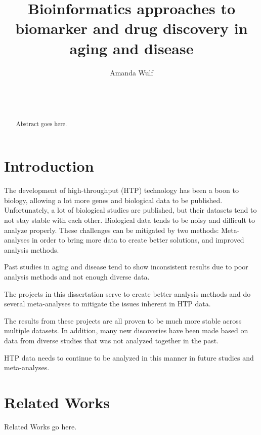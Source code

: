 \documentclass{sig-alternate-05-2015}
\begin{document}
\title{Bioinformatics approaches to biomarker and drug discovery in aging and disease}
\author{
\alignauthor
Amanda Wulf\\
       \\
       \\
       \\
}
\maketitle
\begin{abstract}
Abstract goes here.
\end{abstract}

\section{Introduction}
The development of high-throughput (HTP) technology has been a boon to
biology, allowing a lot more genes and biological data to be published.
Unfortunately, a lot of biological studies are published, but their datasets
tend to not stay
stable with each other. Biological data tends to be noisy and difficult to
analyze properly. These challenges can be mitigated by two methods: Meta-analyses in
order to bring more data to create better solutions, and improved analysis
methods.

Past studies in aging and disease tend to show inconsistent results due to poor
analysis methods and not enough diverse data.

The projects in this dissertation serve to create better analysis methods and
do several meta-analyses to mitigate the issues inherent in HTP data.

The results from these projects are all proven to be much more stable across
multiple datasets. In addition, many new discoveries have been made based on
data from diverse studies that was not analyzed together in the past.

HTP data needs to continue to be analyzed in this manner in future studies and
meta-analyses.

\section{Related Works}
Related Works go here.
\end{document}
